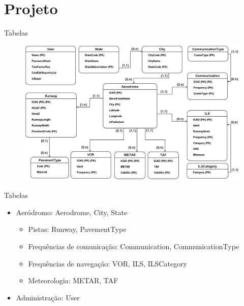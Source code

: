 \documentclass{beamer}
\begin{document}
\section{Projeto}

\begin{frame}{Tabelas}
    \begin{figure}[ht]
        \begin{center}
        \includegraphics[width=0.8\linewidth]{img/ERAero.png}
        \label{fig:arquitetura}
        \end{center}
    \end{figure}
\end{frame}

\begin{frame}{Tabelas}
    \begin{itemize}
        \item Aeródromo: Aerodrome, City, State
        \begin{itemize}
            \item \small{Pistas:} Runway, PavementType
            \pause
            \item Frequências de comunicação: Communication, CommunicationType
            \item Frequências de navegação: VOR, ILS, ILSCategory
            \pause
            \item Meteorologia: METAR, TAF
        \end{itemize}
    \end{itemize}
    \pause
    \begin{itemize}
        \item Administração: User
    \end{itemize}
\end{frame}
\end{document}

